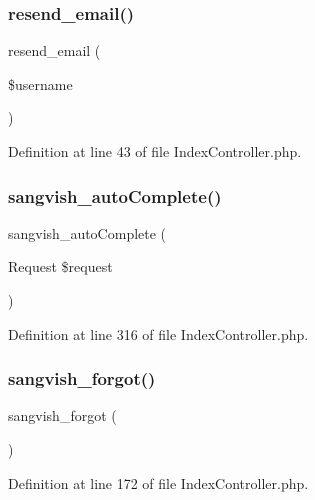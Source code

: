 \subsubsection{\texorpdfstring{resend\_email()}{resend\_email()}}
{\footnotesize\ttfamily resend\+\_\+email (\begin{DoxyParamCaption}\item[{}]{\$username }\end{DoxyParamCaption})}



Definition at line 43 of file Index\+Controller.\+php.

\mbox{\label{class_responsive_1_1_http_1_1_controllers_1_1_index_controller_ae9bd9dd42150df3dc1deb9544ded76f7}} 
\subsubsection{\texorpdfstring{sangvish\_autoComplete()}{sangvish\_autoComplete()}}
{\footnotesize\ttfamily sangvish\+\_\+auto\+Complete (\begin{DoxyParamCaption}\item[{Request}]{\$request }\end{DoxyParamCaption})}



Definition at line 316 of file Index\+Controller.\+php.

\mbox{\label{class_responsive_1_1_http_1_1_controllers_1_1_index_controller_a9d71d2c574f09648bdc00f4b32e62c64}} 
\subsubsection{\texorpdfstring{sangvish\_forgot()}{sangvish\_forgot()}}
{\footnotesize\ttfamily sangvish\+\_\+forgot (\begin{DoxyParamCaption}{ }\end{DoxyParamCaption})}



Definition at line 172 of file Index\+Controller.\+php.


